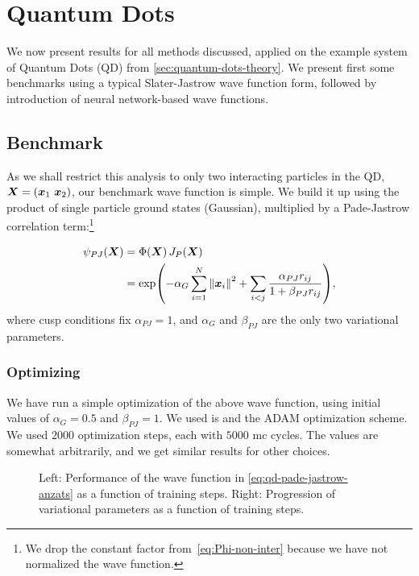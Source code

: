 \documentclass[Thesis.tex]{subfiles}
\begin{document}
\chapter{Quantum Dots}
\label{chp:quantum-dots}

We now present results for all methods discussed, applied on the example system
of Quantum Dots (QD) from \cref{sec:quantum-dots-theory}. We present first some
benchmarks using a typical Slater-Jastrow wave function form, followed by
introduction of neural network-based wave functions.

\section{Benchmark}

As we shall restrict this analysis to only two interacting particles in the QD,
$\bm{X} = (\bm{x}_1\ \bm{x}_2)$, our benchmark wave function is simple. We build
it up using the product of single particle ground states (Gaussian), multiplied
by a Pade-Jastrow correlation term:\footnote{We drop the constant factor from~\cref{eq:Phi-non-inter} because we have not normalized the wave function.}

\begin{align}
  \label{eq:qd-pade-jastrow-anzats}
  \psi_{PJ}(\bm{X}) &= \Phi(\bm{X}) \,J_P(\bm{X})\\
  &= \exp(-\alpha_G\sum_{i=1}^N \norm{\bm{x}_i}^2 + \sum_{i < j} \frac{\alpha_{PJ}
    r_{ij}}{1 + \beta_{PJ} r_{ij}}),
\end{align}
where cusp conditions fix $\alpha_{PJ} = 1$, and $\alpha_G$ and $\beta_{PJ}$
are the only two variational parameters.

\subsection{Optimizing}

We have run a simple optimization of the above wave function, using initial
values of $\alpha_G = 0.5$ and $\beta_{PJ} = 1$. We used \acrlong{is} and the
ADAM optimization scheme. We used $\num{2000}$ optimization steps, each with
$\num{5000}$ \gls{mc} cycles. The values are somewhat arbitrarily, and we get
similar results for other choices.

\begin{figure}[h]
   \centering
    \resizebox{\linewidth}{!}{%
        
    }
    \caption[Learning progression of Pade-Jastrow wave function]{\label{fig:QD-benchmark-pade-jastrow-training}Left: Performance of the
      wave function in \cref{eq:qd-pade-jastrow-anzats} as a function of
      training steps. Right: Progression of variational parameters as a function
      of training steps.}
\end{figure}
\end{document}
